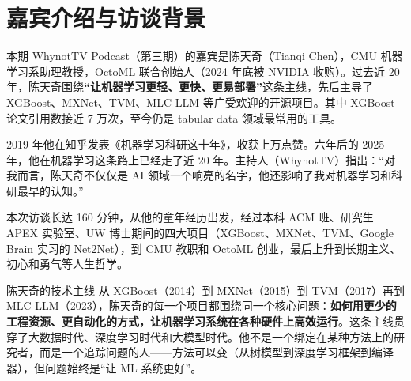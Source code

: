 \section{嘉宾介绍与访谈背景}

本期 WhynotTV Podcast（第三期）的嘉宾是陈天奇（Tianqi Chen），CMU 机器学习系助理教授，OctoML 联合创始人（2024 年底被 NVIDIA 收购）。过去近 20 年，陈天奇围绕\textbf{``让机器学习更轻、更快、更易部署''}这条主线，先后主导了 XGBoost、MXNet、TVM、MLC LLM 等广受欢迎的开源项目。其中 XGBoost 论文引用数接近 7 万次，至今仍是 tabular data 领域最常用的工具。

2019 年他在知乎发表《机器学习科研这十年》，收获上万点赞。六年后的 2025 年，他在机器学习这条路上已经走了近 20 年。主持人（WhynotTV）指出：``对我而言，陈天奇不仅仅是 AI 领域一个响亮的名字，他还影响了我对机器学习和科研最早的认知。''

本次访谈长达 160 分钟，从他的童年经历出发，经过本科 ACM 班、研究生 APEX 实验室、UW 博士期间的四大项目（XGBoost、MXNet、TVM、Google Brain 实习的 Net2Net），到 CMU 教职和 OctoML 创业，最后上升到长期主义、初心和勇气等人生哲学。

\begin{importantbox}{陈天奇的技术主线}
从 XGBoost（2014）到 MXNet（2015）到 TVM（2017）再到 MLC LLM（2023），陈天奇的每一个项目都围绕同一个核心问题：\textbf{如何用更少的工程资源、更自动化的方式，让机器学习系统在各种硬件上高效运行}。这条主线贯穿了大数据时代、深度学习时代和大模型时代。他不是一个绑定在某种方法上的研究者，而是一个追踪问题的人------方法可以变（从树模型到深度学习框架到编译器），但问题始终是``让 ML 系统更好''。
\end{importantbox}

